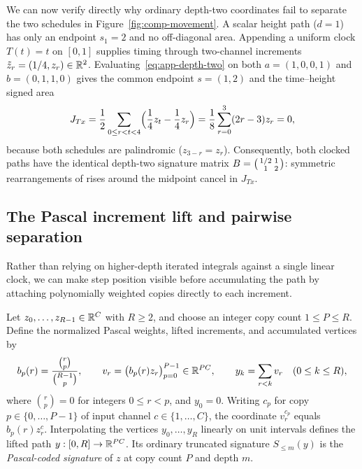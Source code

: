 We can now verify directly why ordinary depth-two coordinates fail to separate
the two schedules in Figure~\ref{fig:comp-movement}. A scalar height path
(\(d=1\)) has only an endpoint \(s_1 = 2\) and no off-diagonal area. Appending a
uniform clock \(T(t) = t\) on \([0,1]\) supplies timing through two-channel
increments \(\tilde z_r = (1/4, z_r) \in \mathbb{R}^2\). Evaluating~\eqref{eq:app-depth-two}
on both \(a = (1, 0, 0, 1)\) and \(b = (0, 1, 1, 0)\) gives the common endpoint
\(s = (1, 2)\) and the time--height signed area
\[
 J_{Tx} = \frac{1}{2}\sum_{0 \leq r < t < 4}
          \Bigl(\frac{1}{4} z_t - \frac{1}{4} z_r\Bigr)
        = \frac{1}{8}\sum_{r=0}^{3} (2r - 3) z_r = 0,
\]
because both schedules are palindromic (\(z_{3-r} = z_r\)). Consequently, both
clocked paths have the identical depth-two signature matrix
\(B = \begin{psmallmatrix} 1/2 & 1 \\ 1 & 2 \end{psmallmatrix}\): symmetric
rearrangements of rises around the midpoint cancel in \(J_{Tx}\).

\subsection{The Pascal increment lift and pairwise separation}
\label{app:movement}
Rather than relying on higher-depth iterated integrals against a single linear
clock, we can make step position visible before accumulating the path by
attaching polynomially weighted copies directly to each increment.

\begin{definition}
\label{def:pascal-lift}
Let \(z_0, \ldots, z_{R-1} \in \mathbb{R}^C\) with \(R \geq 2\), and choose an integer
copy count \(1 \leq P \leq R\). Define the normalized Pascal weights, lifted
increments, and accumulated vertices by
\begin{equation}\label{eq:app-pascal}
 b_p(r) = \frac{\binom{r}{p}}{\binom{R-1}{p}}, \qquad
 v_r = \bigl(b_p(r) z_r\bigr)_{p=0}^{P-1} \in \mathbb{R}^{PC}, \qquad
 y_k = \sum_{r < k} v_r \quad (0 \leq k \leq R),
\end{equation}
where \(\binom{r}{p} = 0\) for integers \(0 \leq r < p\), and \(y_0 = 0\). Writing
\(c_p\) for copy \(p \in \{0, \ldots, P-1\}\) of input channel
\(c \in \{1, \ldots, C\}\), the coordinate \(v_r^{c_p}\) equals \(b_p(r) z_r^c\).
Interpolating the vertices \(y_0, \ldots, y_R\) linearly on unit intervals defines
the lifted path \(y:[0,R]\to\mathbb{R}^{PC}\). Its ordinary truncated signature
\(S_{\leq m}(y)\) is the \emph{Pascal-coded signature} of \(z\) at copy count
\(P\) and depth \(m\).
\end{definition}

